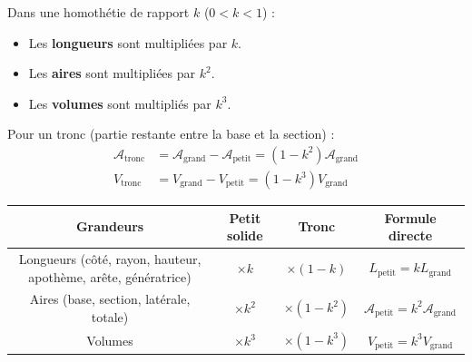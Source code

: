 \documentclass[11pt]{article}
\begin{document}
\begin{propriete}
    Dans une homothétie de rapport $k$ ($0<k<1$) :
    \begin{itemize}
        \item Les \textbf{longueurs} sont multipliées par $k$.
        \item Les \textbf{aires} sont multipliées par $k^2$.
        \item Les \textbf{volumes} sont multipliés par $k^3$.
    \end{itemize}
    Pour un tronc (partie restante entre la base et la section) :
    \begin{align*}
        \mathcal{A}_{\text{tronc}} &= \mathcal{A}_{\text{grand}} - \mathcal{A}_{\text{petit}} = (1 - k^2) \mathcal{A}_{\text{grand}} \\
        V_{\text{tronc}} &= V_{\text{grand}} - V_{\text{petit}} = (1 - k^3) V_{\text{grand}}
    \end{align*}
\end{propriete}

\begin{aretenir}
    \begin{center}
    \begin{tabular}{|c|c|c|c|}\hline
    \rowcolor{popblueL} \textbf{Grandeurs} & \textbf{Petit solide} & \textbf{Tronc} & \textbf{Formule directe} \\ \hline
    Longueurs (côté, rayon, hauteur, apothème, arête, génératrice) & $\times k$ & $\times (1-k)$ & $L_{\text{petit}} = k L_{\text{grand}}$ \\ \hline
    Aires (base, section, latérale, totale) & $\times k^2$ & $\times (1-k^2)$ & $\mathcal{A}_{\text{petit}} = k^2 \mathcal{A}_{\text{grand}}$ \\ \hline
    Volumes & $\times k^3$ & $\times (1-k^3)$ & $V_{\text{petit}} = k^3 V_{\text{grand}}$ \\ \hline
    \end{tabular}
    \end{center}
\end{aretenir}
\end{document}
